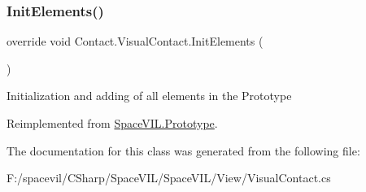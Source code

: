 \subsubsection{\texorpdfstring{Init\+Elements()}{InitElements()}}
{\footnotesize\ttfamily override void Contact.\+Visual\+Contact.\+Init\+Elements (\begin{DoxyParamCaption}{ }\end{DoxyParamCaption})\hspace{0.3cm}{\ttfamily [virtual]}}



Initialization and adding of all elements in the Prototype 



Reimplemented from \mbox{\hyperlink{class_space_v_i_l_1_1_prototype_ac3379fe02923ee155b5b0084abf27420}{Space\+V\+I\+L.\+Prototype}}.



The documentation for this class was generated from the following file\+:\begin{DoxyCompactItemize}
\item 
F\+:/spacevil/\+C\+Sharp/\+Space\+V\+I\+L/\+Space\+V\+I\+L/\+View/Visual\+Contact.\+cs\end{DoxyCompactItemize}
